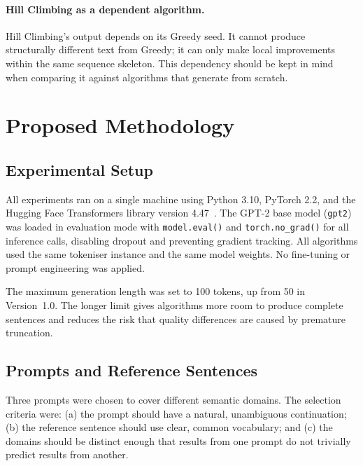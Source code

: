 \documentclass[12pt]{article}
\begin{document}
	\paragraph{Hill Climbing as a dependent algorithm.}
	Hill Climbing's output depends on its Greedy seed. It cannot produce structurally different text from Greedy; it can only make local improvements within the same sequence skeleton. This dependency should be kept in mind when comparing it against algorithms that generate from scratch.
	
	\section{Proposed Methodology}
	\label{sec:method}
	
	\subsection{Experimental Setup}
	
	All experiments ran on a single machine using Python 3.10, PyTorch 2.2, and the Hugging Face Transformers library version 4.47~\cite{wolf2020transformers}. The GPT-2 base model (\texttt{gpt2}) was loaded in evaluation mode with \texttt{model.eval()} and \texttt{torch.no\_grad()} for all inference calls, disabling dropout and preventing gradient tracking. All algorithms used the same tokeniser instance and the same model weights. No fine-tuning or prompt engineering was applied.
	
	The maximum generation length was set to 100 tokens, up from 50 in Version~1.0. The longer limit gives algorithms more room to produce complete sentences and reduces the risk that quality differences are caused by premature truncation.
	
	\subsection{Prompts and Reference Sentences}
	
	Three prompts were chosen to cover different semantic domains. The selection criteria were: (a) the prompt should have a natural, unambiguous continuation; (b) the reference sentence should use clear, common vocabulary; and (c) the domains should be distinct enough that results from one prompt do not trivially predict results from another.
	
\end{document}
